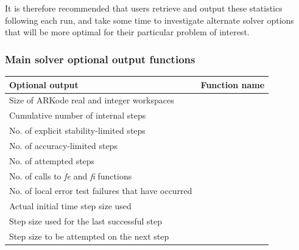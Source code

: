 \documentclass[letterpaper,10pt,english]{sphinxmanual}
\begin{document}
It is therefore recommended that users retrieve and output these
statistics following each run, and take some time to investigate
alternate solver options that will be more optimal for their
particular problem of interest.


\subsubsection{Main solver optional output functions}
\label{c_interface/User_callable:main-solver-optional-output-functions}\label{c_interface/User_callable:cinterface-arkodemainoutputs}
\begin{tabulary}{\linewidth}{|L|L|}
\hline
\textsf{\relax 
Optional output
} & \textsf{\relax 
Function name
}\\
\hline
Size of ARKode real and integer workspaces
 & 
{\hyperref[c_interface/User_callable:c.ARKodeGetWorkSpace]{\emph{}}}
\\
\hline
Cumulative number of internal steps
 & 
{\hyperref[c_interface/User_callable:c.ARKodeGetNumSteps]{\emph{}}}
\\
\hline
No. of explicit stability-limited steps
 & 
{\hyperref[c_interface/User_callable:c.ARKodeGetNumExpSteps]{\emph{}}}
\\
\hline
No. of accuracy-limited steps
 & 
{\hyperref[c_interface/User_callable:c.ARKodeGetNumAccSteps]{\emph{}}}
\\
\hline
No. of attempted steps
 & 
{\hyperref[c_interface/User_callable:c.ARKodeGetNumStepAttempts]{\emph{}}}
\\
\hline
No. of calls to \emph{fe} and \emph{fi} functions
 & 
{\hyperref[c_interface/User_callable:c.ARKodeGetNumRhsEvals]{\emph{}}}
\\
\hline
No. of local error test failures that have occurred
 & 
{\hyperref[c_interface/User_callable:c.ARKodeGetNumErrTestFails]{\emph{}}}
\\
\hline
Actual initial time step size used
 & 
{\hyperref[c_interface/User_callable:c.ARKodeGetActualInitStep]{\emph{}}}
\\
\hline
Step size used for the last successful step
 & 
{\hyperref[c_interface/User_callable:c.ARKodeGetLastStep]{\emph{}}}
\\
\hline
Step size to be attempted on the next step

\end{tabulary}
\end{document}

